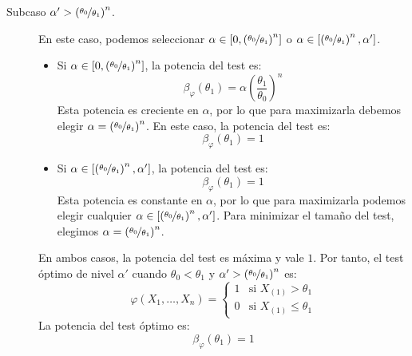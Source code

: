 \begin{ejercicio}
\begin{description}
\begin{description}
            \item[Subcaso $\alpha' > \left(\nicefrac{\theta_0}{\theta_1}\right)^n$.] En este caso, podemos seleccionar $\alpha \in \left[0, \left(\nicefrac{\theta_0}{\theta_1}\right)^n\right]$ o $\alpha \in \left[\left(\nicefrac{\theta_0}{\theta_1}\right)^n, \alpha'\right]$.
            \begin{itemize}
                \item Si $\alpha \in \left[0, \left(\nicefrac{\theta_0}{\theta_1}\right)^n\right]$, la potencia del test es:
                \begin{equation*}
                    \beta_\varphi(\theta_1) = \alpha\left(\frac{\theta_1}{\theta_0}\right)^n
                \end{equation*}
                Esta potencia es creciente en $\alpha$, por lo que para maximizarla debemos elegir $\alpha = \left(\nicefrac{\theta_0}{\theta_1}\right)^n$. En este caso, la potencia del test es:
                \begin{equation*}
                    \beta_\varphi(\theta_1) = 1
                \end{equation*}
                \item Si $\alpha \in \left[\left(\nicefrac{\theta_0}{\theta_1}\right)^n, \alpha'\right]$, la potencia del test es:
                \begin{equation*}
                    \beta_\varphi(\theta_1) = 1
                \end{equation*}
                Esta potencia es constante en $\alpha$, por lo que para maximizarla podemos elegir cualquier $\alpha \in \left[\left(\nicefrac{\theta_0}{\theta_1}\right)^n, \alpha'\right]$. Para minimizar el tamaño del test, elegimos $\alpha = \left(\nicefrac{\theta_0}{\theta_1}\right)^n$.
            \end{itemize}

            En ambos casos, la potencia del test es máxima y vale $1$. Por tanto, el test óptimo de nivel $\alpha'$ cuando $\theta_0 < \theta_1$ y $\alpha' > \left(\nicefrac{\theta_0}{\theta_1}\right)^n$ es:
            \begin{equation*}
                \varphi(X_1, \ldots, X_n) = \left\{\begin{array}{ll}
                    1 & \text{si\ } X_{(1)} > \theta_1 \\
                    0 & \text{si\ } X_{(1)} \leq \theta_1
                \end{array}\right.
            \end{equation*}
            La potencia del test óptimo es:
            \begin{equation*}
                \beta_\varphi(\theta_1) = 1
            \end{equation*}
        \end{description}


\end{description}
\end{ejercicio}
